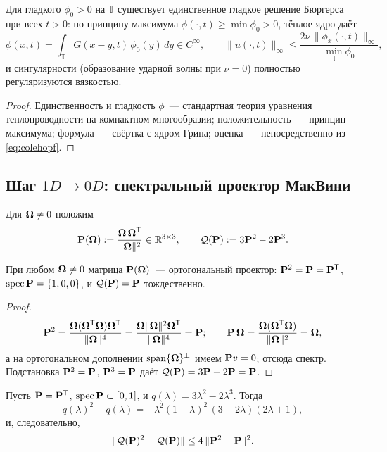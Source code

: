 \begin{corollary}\label{cor:burgers-global}
Для гладкого $\phi_0 > 0$ на $\mathbb T$ существует единственное
гладкое решение Бюргерса при всех $t > 0$: по принципу максимума
$\phi(\cdot,t) \ge \min \phi_0 > 0$, тёплое ядро даёт
\[
  \phi(x,t) = \int_{\mathbb T} G(x-y,t)\,\phi_0(y)\,dy \in C^\infty,
  \qquad
  \|u(\cdot,t)\|_\infty \le \frac{2\nu\,\|\phi_x(\cdot,t)\|_\infty}{\min_{\mathbb T}\phi_0},
\]
и сингулярности (образование ударной волны при $\nu = 0$) полностью
регуляризуются вязкостью.
\end{corollary}

\begin{proof}
Единственность и гладкость $\phi$~--- стандартная теория уравнения
теплопроводности на компактном многообразии; положительность~---
принцип максимума; формула~--- свёртка с ядром Грина; оценка~---
непосредственно из \eqref{eq:colehopf}.
\end{proof}

\subsection{Шаг $1D \to 0D$: спектральный проектор МакВини}

\begin{definition}\label{def:proj}
Для $\boldsymbol{\Omega} \ne 0$ положим
\[
  \mathbf{P}(\boldsymbol{\Omega}) := \frac{\boldsymbol{\Omega}\,\boldsymbol{\Omega}^{\mathsf T}}{\|\boldsymbol{\Omega}\|^2} \in \mathbb{R}^{3\times3},
  \qquad
  \mathcal Q(\mathbf{P}) := 3\mathbf{P}^2 - 2\mathbf{P}^3 .
\]
\end{definition}

\begin{lemma}\label{lem:rank1}
При любом $\boldsymbol{\Omega} \ne 0$ матрица $\mathbf{P}(\boldsymbol{\Omega})$~--- ортогональный проектор:
$\mathbf{P}^2 = \mathbf{P} = \mathbf{P}^{\mathsf T}$, $\operatorname{spec}\mathbf{P} = \{1,0,0\}$, и
$\mathcal Q(\mathbf{P}) = \mathbf{P}$ тождественно.
\end{lemma}

\begin{proof}
\[
  \mathbf{P}^2 = \frac{\boldsymbol{\Omega}(\boldsymbol{\Omega}^{\mathsf T}\boldsymbol{\Omega})\boldsymbol{\Omega}^{\mathsf T}}{\|\boldsymbol{\Omega}\|^4}
  = \frac{\boldsymbol{\Omega}\|\boldsymbol{\Omega}\|^2\boldsymbol{\Omega}^{\mathsf T}}{\|\boldsymbol{\Omega}\|^4} = \mathbf{P};
  \qquad
  \mathbf{P}\,\boldsymbol{\Omega} = \frac{\boldsymbol{\Omega}(\boldsymbol{\Omega}^{\mathsf T}\boldsymbol{\Omega})}{\|\boldsymbol{\Omega}\|^2} = \boldsymbol{\Omega},
\]
а на ортогональном дополнении $\operatorname{span}\{\boldsymbol{\Omega}\}^\perp$ имеем
$\mathbf{P} v = 0$; отсюда спектр. Подстановка $\mathbf{P}^2 = \mathbf{P}$,
$\mathbf{P}^3 = \mathbf{P}$ даёт $\mathcal Q(\mathbf{P}) = 3\mathbf{P} - 2\mathbf{P} = \mathbf{P}$.
\end{proof}

\begin{lemma}\label{lem:q-spectral}
Пусть $\mathbf{P} = \mathbf{P}^{\mathsf T}$, $\operatorname{spec}\mathbf{P} \subset [0,1]$, и
$q(\lambda) = 3\lambda^2 - 2\lambda^3$. Тогда
\begin{equation}\label{eq:factorization}
  q(\lambda)^2 - q(\lambda)
  = -\lambda^2(1-\lambda)^2\,(3-2\lambda)(2\lambda+1),
\end{equation}
и, следовательно,
\begin{equation}\label{eq:q-bound}
  \|\mathcal Q(\mathbf{P})^2 - \mathcal Q(\mathbf{P})\|
  \le 4\,\|\mathbf{P}^2 - \mathbf{P}\|^2 .
\end{equation}
\end{lemma}

